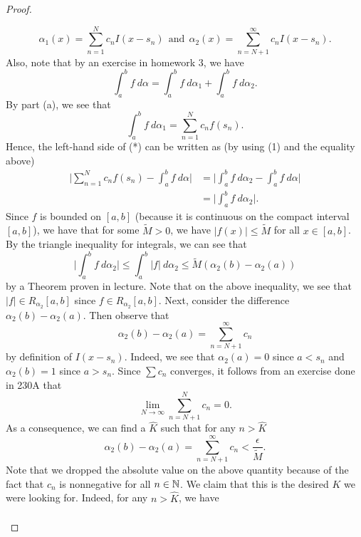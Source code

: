 \documentclass[a4paper]{article}
\begin{document}
\begin{proof}
\begin{enumerate}
    \[  {\alpha}_{1}(x) = \sum_{ n=1  }^{ N  } {c}_{n} I(x - {s}_{n}) \ \ \text{and} \  \ {\alpha}_{2}(x) = \sum_{ n= N + 1 }^{ \infty  } {c}_{n} I(x - {s}_{n}). \]
    Also, note that by an exercise in homework 3, we have
    \[ \int_{ a }^{ b }  f  \ d \alpha = \int_{ a }^{ b }  f  \ d {\alpha}_{1} + \int_{ a }^{ b }  f  \ d {\alpha}_{2}. \tag{1}  \]
   By part (a), we see that  
   \[  \int_{ a }^{ b } f \ d \alpha_1 = \sum_{ n=1  }^{ N  } {c}_{n} f({s}_{n}). \]
   Hence, the left-hand side of (*) can be written as (by using (1) and the equality above)
   \begin{align*}
       \Big| \sum_{ n=1  }^{ N  } {c}_{n} f({s}_{n}) - \int_{ a }^{ b }  f \ d \alpha \Big| &= \Big| \int_{ a }^{ b }  f  \ d \alpha_2 - \int_{ a }^{ b }  f  \ d \alpha \Big|  \\
                                                                                            &= \Big| \int_{ a }^{ b }  f  \ d {\alpha}_{2} \Big|. 
   \end{align*}
   Since \( f  \) is bounded on \( [a,b] \) (because it is continuous on the compact interval \( [a,b] \)), we have that for some \( \tilde{M} > 0 \), we have \( | f(x) |  \leq \tilde{M} \) for all \( x \in [a,b] \). By the triangle inequality for integrals, we can see that 
   \[  \Big| \int_{ a }^{ b }  f  \ d {\alpha}_{2} \Big|  \leq \int_{ a }^{ b }  | f |  \ d {\alpha}_{2} \leq \tilde{M} ({\alpha}_{2}(b) - {\alpha}_{2}(a)) \]
   by a Theorem proven in lecture. Note that on the above inequality, we see that \( | f | \in R_{\alpha_2}[a,b] \) since \( f \in {R}_{{\alpha}_{2}}[a,b] \). Next, consider the difference \( {\alpha}_{2}(b) - {\alpha}_{2}(a) \).
   Then observe that 
   \[ {\alpha}_{2}(b) - {\alpha}_{2}(a) = \sum_{ n= N + 1 }^{ \infty  } {c}_{n} \]
   by definition of \( I(x - {s}_{n}) \). Indeed, we see that \( \alpha_2(a)  =  0  \) since \( a < {s}_{n} \) and \( {\alpha}_{2}(b) = 1  \) since \( a > {s}_{n} \). Since \( \sum {c}_{n} \) converges, it follows from an exercise done in 230A that 
   \[  \lim_{ N \to \infty  } \sum_{ n=  N + 1 }^{ N } {c}_{n} = 0.   \]
   As a consequence, we can find a \( \hat{K}  \) such that for any \( n > \hat{K} \)    
   \[  {\alpha}_{2}(b) - {\alpha}_{2}(a)  = \sum_{ n = N + 1 }^{ \infty  }{c}_{n} < \frac{ \epsilon }{ \tilde{M} }.  \]
   Note that we dropped the absolute value on the above quantity because of the fact that \( {c}_{n}  \) is nonnegative for all \( n \in \mathbb{N} \). We claim that this is the desired \( K \) we were looking for. Indeed, for any \( n > \hat{K} \), we have 
   \begin{align*}

\end{align*}
\end{enumerate}
\end{proof}
\end{document}
